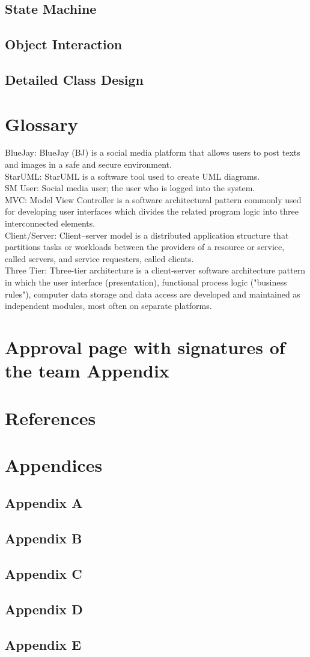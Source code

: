\documentclass{report}
\begin{document}
\section{State Machine}
\section{Object Interaction}
\section{Detailed Class Design}
\chapter{Glossary}
BlueJay: BlueJay (BJ) is a social media platform that allows users to post texts and images in a safe and secure environment.\\
StarUML: StarUML is a software tool used to create UML diagrams.\\
SM User: Social media user; the user who is logged into the system.\\
MVC: Model View Controller is a software architectural pattern commonly used for developing user interfaces which divides the related program logic into three interconnected elements.\\
Client/Server: Client–server model is a distributed application structure that partitions tasks or workloads between the providers of a resource or service, called servers, and service requesters, called clients.\\
Three Tier: Three-tier architecture is a client-server software architecture pattern in which the user interface (presentation), functional process logic ("business rules"), computer data storage and data access are developed and maintained as independent modules, most often on separate platforms.\\
\chapter{Approval page with signatures of the team Appendix} 
\chapter{References}
\chapter{Appendices}
\section{Appendix A}
\section{Appendix B}
\section{Appendix C}
\section{Appendix D}
\section{Appendix E}
\end{document}
